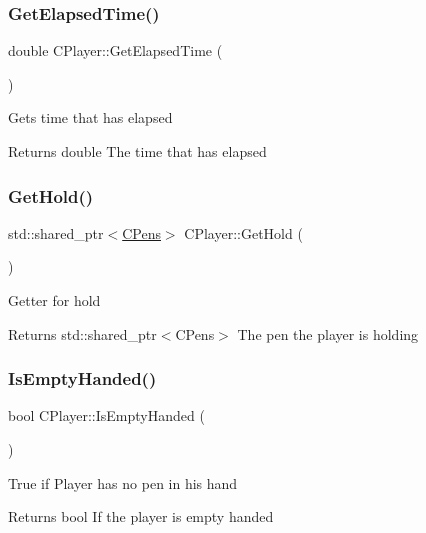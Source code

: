 \subsubsection{\texorpdfstring{GetElapsedTime()}{GetElapsedTime()}}
{\footnotesize\ttfamily double C\+Player\+::\+Get\+Elapsed\+Time (\begin{DoxyParamCaption}{ }\end{DoxyParamCaption})\hspace{0.3cm}{\ttfamily [inline]}}

Gets time that has elapsed \begin{DoxyReturn}{Returns}
double The time that has elapsed 
\end{DoxyReturn}
\mbox{\label{class_c_player_afbe9687de700ec4dd9188521508bc917}} 
\subsubsection{\texorpdfstring{GetHold()}{GetHold()}}
{\footnotesize\ttfamily std\+::shared\+\_\+ptr$<$\mbox{\hyperlink{class_c_pens}{C\+Pens}}$>$ C\+Player\+::\+Get\+Hold (\begin{DoxyParamCaption}{ }\end{DoxyParamCaption})\hspace{0.3cm}{\ttfamily [inline]}}

Getter for hold \begin{DoxyReturn}{Returns}
std\+::shared\+\_\+ptr$<$\+C\+Pens$>$ The pen the player is holding 
\end{DoxyReturn}
\mbox{\label{class_c_player_a92e3942353b9a954fa0ffdfef6de72ca}} 
\subsubsection{\texorpdfstring{IsEmptyHanded()}{IsEmptyHanded()}}
{\footnotesize\ttfamily bool C\+Player\+::\+Is\+Empty\+Handed (\begin{DoxyParamCaption}{ }\end{DoxyParamCaption})\hspace{0.3cm}{\ttfamily [inline]}}

True if Player has no pen in his hand \begin{DoxyReturn}{Returns}
bool If the player is empty handed 
\end{DoxyReturn}
\mbox{\label{class_c_player_ad2b110ed9eee0e66013110ce645b2e92}} 
